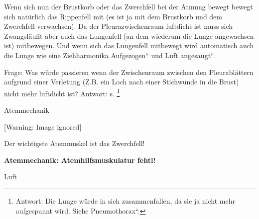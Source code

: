 \documentclass{article}
\begin{document}
{\mdseries
Wenn sich nun der Brustkorb oder das Zwerchfell bei der Atmung bewegt
bewegt sich nat\"urlich das Rippenfell mit (es ist ja mit dem Brustkorb
und dem Zwerchfell verwachsen). Da der Pleurazwischenraum luftdicht ist
muss sich Zwangsl\"aufit aber auch das Lungenfell (an dem wiederum die
Lunge angewachsen ist) mitbewegen. Und wenn sich das Lungenfell
mitbewegt wird automatisch auch die Lunge wie eine Ziehharmonika
{\quotedblbase}Aufgezogen{\textquotedblleft} und Luft
{\quotedblbase}angesaugt{\textquotedblleft}. }

{\mdseries
Frage: Was w\"urde passieren wenn der Zwischenraum zwischen den
Pleurabl\"attern aufgrund einer Verletung (Z.B. ein Loch nach einer
Stichwunde in die Brust) nicht mehr luftdicht ist? Antwort: s.
\footnote{Antwort: Die Lunge w\"urde in sich zusammenfallen, da sie ja
nicht mehr aufgespannt wird. Siehe
{\quotedblbase}Pneumothorax{\textquotedblleft}.} }

{\mdseries\color[rgb]{0.0,0.0,0.5019608}
Atemmechanik%
%
}

  [Warning: Image ignored] %
 

{\mdseries
Der wichtigste Atemmuskel ist das Zwerchfell! }

{\bfseries\color[rgb]{0.5019608,0.0,0.0}
Atemmechanik: Atemhilfsmuskulatur fehtl!}

{\mdseries\color[rgb]{0.0,0.0,0.5019608}
Luft}
\end{document}
